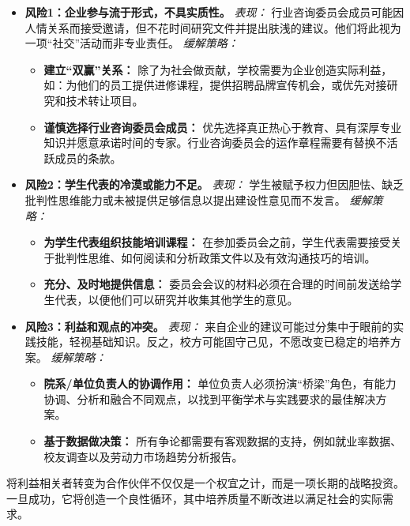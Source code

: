 \begin{itemize}
    \item \textbf{风险1：企业参与流于形式，不具实质性。}
    \textit{表现：} 行业咨询委员会成员可能因人情关系而接受邀请，但不花时间研究文件并提出肤浅的建议。他们将此视为一项“社交”活动而非专业责任。
    \textit{缓解策略：}
    \begin{itemize}
        \item \textbf{建立“双赢”关系：} 除了为社会做贡献，学校需要为企业创造实际利益，如：为他们的员工提供进修课程，提供招聘品牌宣传机会，或优先对接研究和技术转让项目。
        \item \textbf{谨慎选择行业咨询委员会成员：} 优先选择真正热心于教育、具有深厚专业知识并愿意承诺时间的专家。行业咨询委员会的运作章程需要有替换不活跃成员的条款。
    \end{itemize}

    \item \textbf{风险2：学生代表的冷漠或能力不足。}
    \textit{表现：} 学生被赋予权力但因胆怯、缺乏批判性思维能力或未被提供足够信息以提出建设性意见而不发言。
    \textit{缓解策略：}
    \begin{itemize}
        \item \textbf{为学生代表组织技能培训课程：} 在参加委员会之前，学生代表需要接受关于批判性思维、如何阅读和分析政策文件以及有效沟通技巧的培训。
        \item \textbf{充分、及时地提供信息：} 委员会会议的材料必须在合理的时间前发送给学生代表，以便他们可以研究并收集其他学生的意见。
    \end{itemize}

    \item \textbf{风险3：利益和观点的冲突。}
    \textit{表现：} 来自企业的建议可能过分集中于眼前的实践技能，轻视基础知识。反之，校方可能固守己见，不愿改变已稳定的培养方案。
    \textit{缓解策略：}
    \begin{itemize}
        \item \textbf{院系/单位负责人的协调作用：} 单位负责人必须扮演“桥梁”角色，有能力协调、分析和融合不同观点，以找到平衡学术与实践要求的最佳解决方案。
        \item \textbf{基于数据做决策：} 所有争论都需要有客观数据的支持，例如就业率数据、校友调查以及劳动力市场趋势分析报告。
    \end{itemize}
\end{itemize}

将利益相关者转变为合作伙伴不仅仅是一个权宜之计，而是一项长期的战略投资。一旦成功，它将创造一个良性循环，其中培养质量不断改进以满足社会的实际需求。

